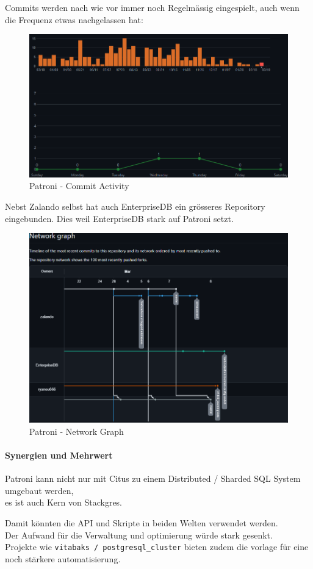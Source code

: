 \begin{flushleft}
    Commits werden nach wie vor immer noch Regelmässig eingespielt, auch wenn die Frequenz etwas nachgelassen hat:
    \begin{figure}[H]
        \centering
        \includegraphics[width=0.75\linewidth]{source/implementation/evaluation/postgresql_ha_solutions/insights/patroni/commit_activity_zalando_patroni}
        \caption{Patroni - Commit Activity}
        \label{fig:commit_activity_zalando_patroni}
    \end{figure}

    Nebst Zalando selbst hat auch EnterpriseDB\cite{LNF967SI} ein grösseres Repository eingebunden.
    Dies weil EnterpriseDB stark auf Patroni setzt.
     \begin{figure}[H]
        \centering
        \includegraphics[width=0.75\linewidth]{source/implementation/evaluation/postgresql_ha_solutions/insights/patroni/networkgraph_zalando_patroni}
        \caption{Patroni - Network Graph}
        \label{fig:networkgraph_zalando_patroni}
    \end{figure}
\end{flushleft}
\begin{flushleft}
    \paragraph{Synergien und Mehrwert}
    Patroni kann nicht nur mit Citus zu einem Distributed / Sharded SQL System umgebaut werden,\\
    es ist auch Kern von Stackgres.
\end{flushleft}
\begin{flushleft}
    Damit könnten die API und Skripte in beiden Welten verwendet werden.\\
    Der Aufwand für die Verwaltung und optimierung würde stark gesenkt.\\
    Projekte wie \texttt{vitabaks / postgresql\_cluster}\cite{HIQVBEPF} bieten zudem die vorlage für eine noch stärkere automatisierung.
\end{flushleft}